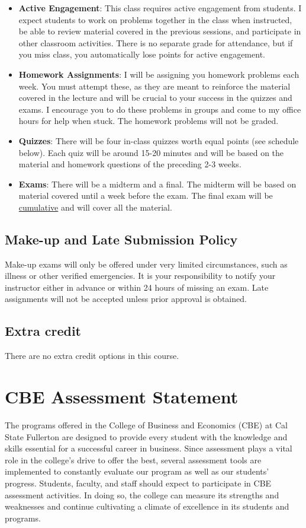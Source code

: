 \documentclass{./../Latex/syllabus}
\begin{document}
\begin{itemize}
\item \textbf{Active Engagement}: This class requires active engagement from students. I expect students to work on problems together in the class when instructed, be able to review material covered in the previous sessions, and participate in other classroom activities. There is no separate grade for attendance, but if you miss class, you automatically lose points for active engagement.
\item \textbf{Homework Assignments}: I will be assigning you homework problems each week. You must attempt these, as they are meant to reinforce the material covered in the lecture and will be crucial to your success in the quizzes and exams. I encourage you to do these problems in groups and come to my office hours for help when stuck. The homework problems will not be graded.
\item \textbf{Quizzes}: There will be four in-class quizzes worth equal points (see schedule below). Each quiz will be around 15-20 minutes and will be based on the material and homework questions of the preceding 2-3 weeks. %
\item \textbf{Exams}: There will be a midterm and a final. The midterm will be based on material covered until a week before the exam. The final exam will be \underline{cumulative} and will cover all the material. 
\end{itemize}

\subsection*{Make-up and Late Submission Policy}

Make-up exams will only be offered under very limited circumstances, such as illness or other verified emergencies. It is your responsibility to notify your instructor either in advance or within 24 hours of missing an exam. Late assignments will not be accepted unless prior approval is obtained. 

\subsection*{Extra credit}

There are no extra credit options in this course. 

\section*{CBE Assessment Statement}
The programs offered in the College of Business and Economics (CBE) at Cal State Fullerton are designed to provide every student with the knowledge and skills essential for a successful career in business. Since assessment plays a vital role in the college's drive to offer the best, several assessment tools are implemented to constantly evaluate our program as well as our students' progress. Students, faculty, and staff should expect to participate in CBE assessment activities. In doing so, the college can measure its strengths and weaknesses and continue cultivating a climate of excellence in its students and programs.
\end{document}

